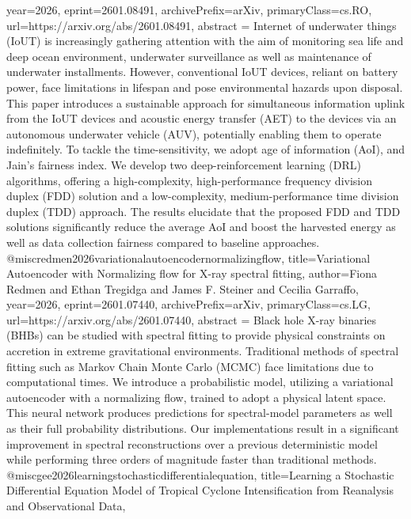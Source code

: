 {      year={2026},
      eprint={2601.08491},
      archivePrefix={arXiv},
      primaryClass={cs.RO},
      url={https://arxiv.org/abs/2601.08491},
      abstract = {Internet of underwater things (IoUT) is increasingly gathering attention with the aim of monitoring sea life and deep ocean environment, underwater surveillance as well as maintenance of underwater installments. However, conventional IoUT devices, reliant on battery power, face limitations in lifespan and pose environmental hazards upon disposal. This paper introduces a sustainable approach for simultaneous information uplink from the IoUT devices and acoustic energy transfer (AET) to the devices via an autonomous underwater vehicle (AUV), potentially enabling them to operate indefinitely. To tackle the time-sensitivity, we adopt age of information (AoI), and Jain's fairness index. We develop two deep-reinforcement learning (DRL) algorithms, offering a high-complexity, high-performance frequency division duplex (FDD) solution and a low-complexity, medium-performance time division duplex (TDD) approach. The results elucidate that the proposed FDD and TDD solutions significantly reduce the average AoI and boost the harvested energy as well as data collection fairness compared to baseline approaches.}
}@misc{redmen2026variationalautoencodernormalizingflow,
      title={Variational Autoencoder with Normalizing flow for X-ray spectral fitting}, 
      author={Fiona Redmen and Ethan Tregidga and James F. Steiner and Cecilia Garraffo},
      year={2026},
      eprint={2601.07440},
      archivePrefix={arXiv},
      primaryClass={cs.LG},
      url={https://arxiv.org/abs/2601.07440},
      abstract = {Black hole X-ray binaries (BHBs) can be studied with spectral fitting to provide physical constraints on accretion in extreme gravitational environments. Traditional methods of spectral fitting such as Markov Chain Monte Carlo (MCMC) face limitations due to computational times. We introduce a probabilistic model, utilizing a variational autoencoder with a normalizing flow, trained to adopt a physical latent space. This neural network produces predictions for spectral-model parameters as well as their full probability distributions. Our implementations result in a significant improvement in spectral reconstructions over a previous deterministic model while performing three orders of magnitude faster than traditional methods.}
}@misc{gee2026learningstochasticdifferentialequation,
      title={Learning a Stochastic Differential Equation Model of Tropical Cyclone Intensification from Reanalysis and Observational Data}, 
}
